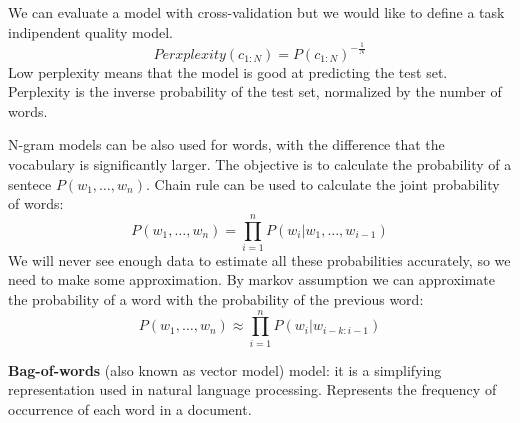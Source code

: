 \documentclass[12pt]{article}
\begin{document}
\begin{enumerate}[label=\textbf{NLP.\arabic*}]
    We can evaluate a model with cross-validation but we would like to define a task indipendent quality model.
    \begin{equation}
        \textit{Perxplexity}(c_{1:N}) = P(c_{1:N})^{-\frac{1}{N}}
    \end{equation}
    Low perplexity means that the model is good at predicting the test set.
    Perplexity is the inverse probability of the test set, normalized by the number of words.

    N-gram models can be also used for words, with the difference that the vocabulary is significantly larger.
    The objective is to calculate the probability of a sentece $P(w_1,\ldots,w_n)$.
    Chain rule can be used to calculate the joint probability of words:
    \begin{equation}
        P(w_1,\ldots,w_n) = \prod_{i=1}^{n}P(w_i|w_1,\ldots,w_{i-1})
    \end{equation}
    We will never see enough data to estimate all these probabilities accurately, so we need to make some approximation.
    By markov assumption we can approximate the probability of a word with the probability of the previous word:
    \begin{equation}
        P(w_1,\ldots,w_n) \approx \prod_{i=1}^{n}P(w_i|w_{i-k:i-1})
    \end{equation}


    \textbf{Bag-of-words} (also known as vector model) model: it is a simplifying representation used in natural language processing.
    Represents the frequency of occurrence of each word in a document.


\end{enumerate}
\end{document}

